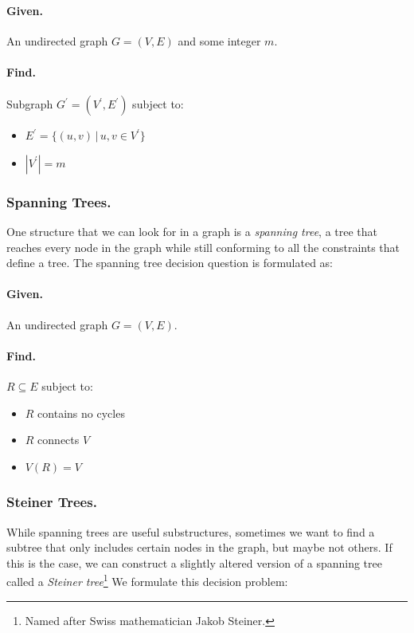\documentclass[12pt,twoside]{reedthesis}
\theoremstyle{definition}
\begin{document}
   \bigbreak

   \hfill\begin{minipage}{\dimexpr\textwidth-2cm}
   \paragraph{Given.}An undirected graph $G=(V,E)$ and some integer $m$.
   \paragraph{Find.}Subgraph $G^\prime = (V^\prime,E^\prime)$ subject to:
   \begin{itemize}
     \item{$E^\prime = \{(u,v) \,|\, u,v \in V^\prime\}$}
     \item{$|V^\prime| = m$}
   \end{itemize}
\xdef\tpd{\the\prevdepth}
\end{minipage}


   \subsubsection{Spanning Trees.}
   One structure that we can look for in a graph is a \textit{spanning tree}, a tree that reaches every node in the graph while still conforming to all the constraints that define a tree. The spanning tree decision question is formulated as:

   \bigbreak

   \hfill\begin{minipage}{\dimexpr\textwidth-2cm}
   \paragraph{Given.}An undirected graph $G=(V,E)$.
   \paragraph{Find.}$R \subseteq E$ subject to:
   \begin{itemize}
     \item{$R$ contains no cycles}
     \item{$R$ connects $V$}
     \item{$V(R) = V$}
   \end{itemize}
\xdef\tpd{\the\prevdepth}
\end{minipage}



   \subsubsection{Steiner Trees.}
   While spanning trees are useful substructures, sometimes we want to find a subtree that only includes certain nodes in the graph, but maybe not others. If this is the case, we can construct a slightly altered version of a spanning tree called a \textit{Steiner tree}\footnote{Named after Swiss mathematician Jakob Steiner.} We formulate this decision problem:
\end{document}

